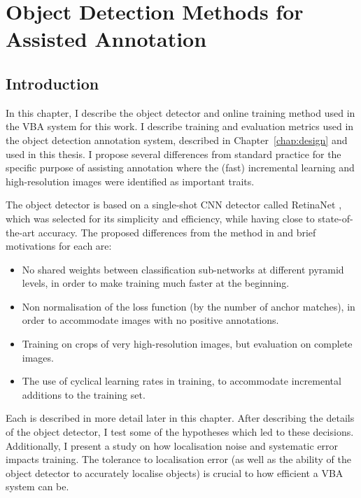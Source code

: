 \chapter{Object Detection Methods for Assisted Annotation}
\label{chap:object_detection} 

\section{Introduction} 

In this chapter, I describe the object detector and online training method used in the \gls{VBA} system for this work. I describe training and evaluation metrics used in the object detection annotation system, described in Chapter~\ref{chap:design} and used in this thesis.  I propose several differences from standard practice for the specific purpose of assisting annotation where the (fast) incremental learning and high-resolution images were identified as important traits.

The object detector is based on a single-shot \gls{CNN} detector called RetinaNet \cite{Lin2017}, which was selected for its simplicity and efficiency, while having close to state-of-the-art accuracy. The proposed  differences from the method in \cite{Lin2017} and brief motivations for each are:

\begin{itemize}
    \item No shared weights between classification sub-networks at different pyramid levels, in order to make training much faster at the beginning.
    \item Non normalisation of the loss function (by the number of anchor matches), in order to accommodate images with no positive annotations.
    \item Training on crops of very high-resolution images, but evaluation on complete images.
    \item The use of cyclical learning rates in training, to accommodate incremental additions to the training set.
\end{itemize}

Each is described in more detail later in this chapter. After describing the details of the object detector, I test some of the hypotheses which led to these decisions. Additionally, I present a study on how localisation noise and systematic error impacts training. The tolerance to localisation error (as well as the ability of the object detector to accurately localise objects) is crucial to how efficient a \gls{VBA} system can be.


